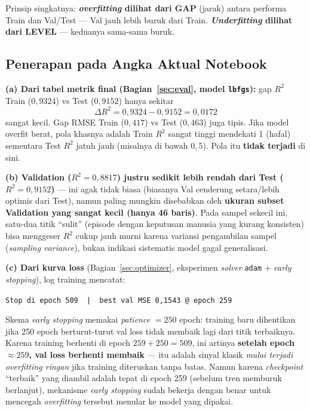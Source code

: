 \documentclass[11pt,a4paper]{article}
\begin{document}
Prinsip singkatnya: \textbf{\emph{overfitting} dilihat dari GAP} (jarak) antara performa
Train dan Val/Test --- Val jauh lebih buruk dari Train. \textbf{\emph{Underfitting}
dilihat dari LEVEL} --- keduanya sama-sama buruk.

\subsection{Penerapan pada Angka Aktual Notebook}

\textbf{(a) Dari tabel metrik final (Bagian~\ref{sec:eval}, model \texttt{lbfgs}):} gap
$R^2$ Train ($0{,}9324$) vs Test ($0{,}9152$) hanya sekitar
\[
  \Delta R^2 = 0{,}9324 - 0{,}9152 = 0{,}0172
\]
sangat kecil. Gap RMSE Train ($0{,}417$) vs Test ($0{,}463$) juga tipis. Jika model
overfit berat, pola khasnya adalah Train $R^2$ sangat tinggi mendekati 1 (hafal)
sementara Test $R^2$ jatuh jauh (misalnya di bawah $0{,}5$). Pola itu \textbf{tidak
terjadi} di sini.

\textbf{(b) Validation ($R^2=0{,}8817$) justru sedikit lebih rendah dari Test
($R^2=0{,}9152$)} --- ini agak tidak biasa (biasanya Val cenderung setara/lebih optimis
dari Test), namun paling mungkin disebabkan oleh \textbf{ukuran subset Validation yang
sangat kecil (hanya 46 baris)}. Pada sampel sekecil ini, satu-dua titik ``sulit''
(episode dengan keputusan manusia yang kurang konsisten) bisa menggeser $R^2$ cukup jauh
murni karena variansi pengambilan sampel (\emph{sampling variance}), bukan indikasi
sistematis model gagal generalisasi.

\textbf{(c) Dari kurva loss} (Bagian~\ref{sec:optimizer}, eksperimen \emph{solver}
\texttt{adam} + \emph{early stopping}), log training mencatat:

\begin{formulabox}
\centering
\texttt{Stop di epoch 509\ \ |\ \ best val MSE 0,1543 @ epoch 259}
\end{formulabox}

Skema \emph{early stopping} memakai \emph{patience} $=250$ epoch: training baru
dihentikan jika 250 epoch berturut-turut val loss tidak membaik lagi dari titik
terbaiknya. Karena training berhenti di epoch $259+250=509$, ini artinya \textbf{setelah
epoch $\approx259$, val loss berhenti membaik} --- itu adalah sinyal klasik \emph{mulai
terjadi overfitting ringan} jika training diteruskan tanpa batas. Namun karena
\emph{checkpoint} ``terbaik'' yang diambil adalah tepat di epoch 259 (sebelum tren
memburuk berlanjut), mekanisme \emph{early stopping} sudah bekerja dengan benar untuk
mencegah \emph{overfitting} tersebut menular ke model yang dipakai.
\end{document}
